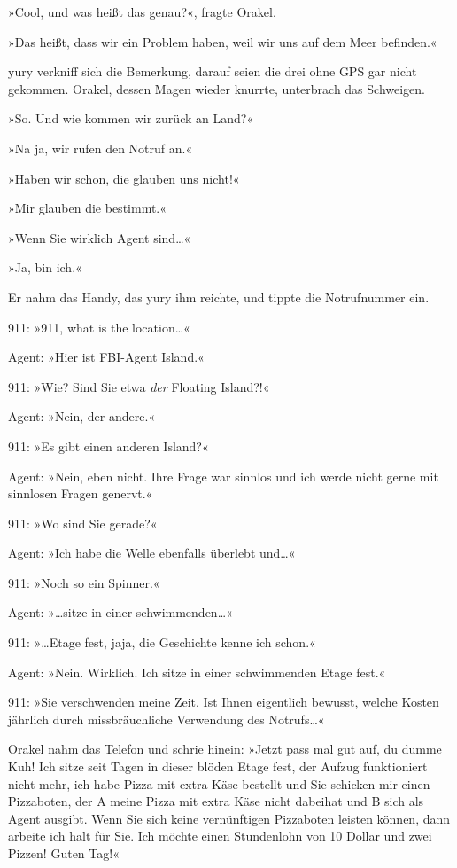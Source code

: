»Cool, und was heißt das genau?«, fragte Orakel.

»Das heißt, dass wir ein Problem haben, weil wir uns auf dem Meer befinden.«

yury verkniff sich die Bemerkung, darauf seien die drei ohne GPS gar nicht gekommen. Orakel, dessen Magen wieder knurrte, unterbrach das Schweigen.

»So. Und wie kommen wir zurück an Land?«

»Na ja, wir rufen den Notruf an.«

»Haben wir schon, die glauben uns nicht!«

»Mir glauben die bestimmt.«

»Wenn Sie wirklich Agent sind…«

»Ja, bin ich.«

Er nahm das Handy, das yury ihm reichte, und tippte die Notrufnummer ein.

911: »911, what is the location…«

Agent: »Hier ist FBI-Agent Island.«

911: »Wie? Sind Sie etwa \emph{der} Floating Island?!«

Agent: »Nein, der andere.«

911: »Es gibt einen anderen Island?«

Agent: »Nein, eben nicht. Ihre Frage war sinnlos und ich werde nicht gerne mit sinnlosen Fragen genervt.«

911: »Wo sind Sie gerade?«

Agent: »Ich habe die Welle ebenfalls überlebt und…«

911: »Noch so ein Spinner.«

Agent: »…sitze in einer schwimmenden…«

911: »…Etage fest, jaja, die Geschichte kenne ich schon.«

Agent: »Nein. Wirklich. Ich sitze in einer schwimmenden Etage fest.«

911: »Sie verschwenden meine Zeit. Ist Ihnen eigentlich bewusst, welche Kosten jährlich durch missbräuchliche Verwendung des Notrufs…«

Orakel nahm das Telefon und schrie hinein: »Jetzt pass mal gut auf, du dumme Kuh! Ich sitze seit Tagen in dieser blöden Etage fest, der Aufzug funktioniert nicht mehr, ich habe Pizza mit extra Käse bestellt und Sie schicken mir einen Pizzaboten, der A meine Pizza mit extra Käse nicht dabeihat und B sich als Agent ausgibt. Wenn Sie sich keine vernünftigen Pizzaboten leisten können, dann arbeite ich halt für Sie. Ich möchte einen Stundenlohn von 10 Dollar und zwei Pizzen! Guten Tag!«

